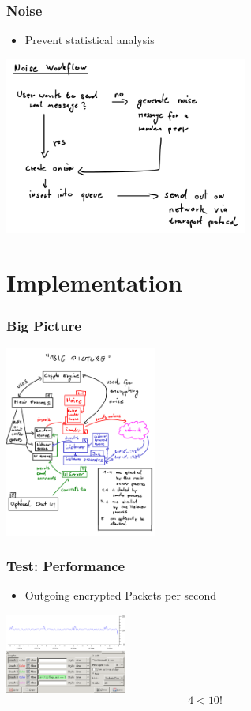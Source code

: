 \documentclass{beamer}
\begin{document}
\frame
{
  \frametitle{Noise}
  \begin{itemize}
      \item Prevent statistical analysis
   \end{itemize}
  \begin{center}
   \includegraphics[width=8cm]{../noiseworkflow.png}
  \end{center}
}


\section{Implementation}
\frame
{
  \frametitle{Big Picture}
  \begin{center}
   \includegraphics[width=5cm]{../bigpicture.png}
  \end{center}
}

\frame
{
  \frametitle{Test: Performance}
  \begin{itemize}
          \item Outgoing encrypted Packets per second
   \end{itemize}
  \begin{center}
   \includegraphics[width=4cm]{../noise-no-limit.png}
   $$4 < 10!$$
  \end{center}
}
\end{document}
